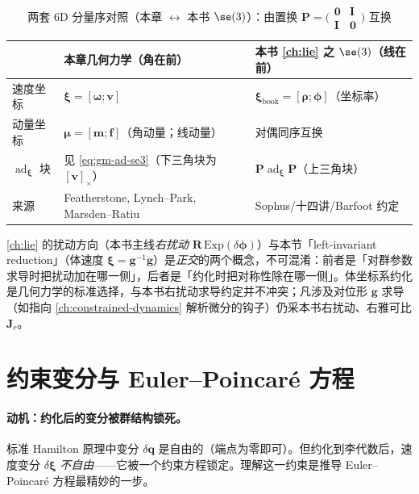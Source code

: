 \begin{table}[H]\centering\small
\caption{两套 $6$D 分量序对照（本章 $\leftrightarrow$ 本书 $\se(3)$）：由置换 $\mathbf P=\bigl(\begin{smallmatrix}\mathbf0&\mathbf I\\\mathbf I&\mathbf0\end{smallmatrix}\bigr)$ 互换}
\label{tab:gm-ordering}
\begin{tabular}{lll}
\toprule
 & 本章几何力学（角在前） & 本书 \cref{ch:lie} 之 $\se(3)$（线在前）\\
\midrule
速度坐标 & $\boldsymbol\xi=[\boldsymbol\omega;\mathbf v]$ & $\boldsymbol\xi_{\mathrm{book}}=[\boldsymbol\rho;\boldsymbol\phi]$（坐标率）\\
动量坐标 & $\boldsymbol\mu=[\mathbf m;\mathbf f]$（角动量；线动量） & 对偶同序互换\\
$\operatorname{ad}_{\boldsymbol\xi}$ 块 & 见 \cref{eq:gm-ad-se3}（下三角块为 $[\mathbf v]_\times$）& $\mathbf P\operatorname{ad}_{\boldsymbol\xi}\mathbf P$（上三角块）\\
来源 & Featherstone, Lynch--Park, Marsden--Ratiu & Sophus/十四讲/Barfoot 约定\\
\bottomrule
\end{tabular}
\end{table}

\begin{remark}
\cref{ch:lie} 的扰动方向（本书主线\emph{右扰动} $\mathbf R\,\mathrm{Exp}(\delta\boldsymbol\phi)$）与本节「left-invariant reduction」（体速度 $\boldsymbol\xi=\mathbf g^{-1}\dot{\mathbf g}$）是\emph{正交}的两个概念，不可混淆：前者是「对群参数求导时把扰动加在哪一侧」，后者是「约化时把对称性除在哪一侧」。体坐标系约化是几何力学的标准选择，与本书右扰动求导约定并不冲突；凡涉及对位形 $\mathbf g$ 求导（如指向 \cref{ch:constrained-dynamics} 解析微分的钩子）仍采本书右扰动、右雅可比 $\mathbf J_r$。
\end{remark}

\section{约束变分与 Euler--Poincaré 方程}
\label{sec:gm-euler-poincare}

\paragraph{动机：约化后的变分被群结构锁死。}
标准 Hamilton 原理中变分 $\delta\mathbf q$ 是自由的（端点为零即可）。但约化到李代数后，速度变分 $\delta\boldsymbol\xi$ \emph{不自由}——它被一个约束方程锁定。理解这一约束是推导 Euler--Poincaré 方程最精妙的一步。

